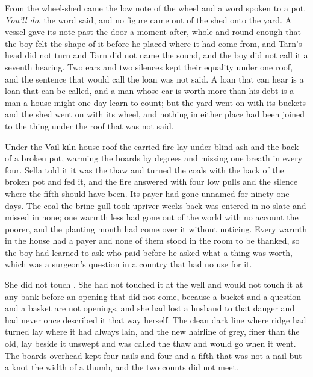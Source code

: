 From the wheel-shed came the low note of the wheel and a word spoken to a pot. \emph{You'll do}, the word said, and no figure came out of the shed onto the yard. A vessel gave its note past the door a moment after, whole and round enough that the boy felt the shape of it before he placed where it had come from, and Tarn's head did not turn and Tarn did not name the sound, and the boy did not call it a seventh hearing. Two ears and two silences kept their equality under one roof, and the sentence that would call the loan was not said. A loan that can hear is a loan that can be called, and a man whose ear is worth more than his debt is a man a house might one day learn to count; but the yard went on with its buckets and the shed went on with its wheel, and nothing in either place had been joined to the thing under the roof that was not said.

Under the Vail kiln-house roof the carried fire lay under blind ash and the back of a broken pot, warming the boards by degrees and missing one breath in every four. Sella told it it was the thaw and turned the coals with the back of the broken pot and fed it, and the fire answered with four low pulls and the silence where the fifth should have been. Its payer had gone unnamed for ninety-one days. The coal the brine-gull took upriver weeks back was entered in no slate and missed in none; one warmth less had gone out of the world with no account the poorer, and the planting month had come over it without noticing. Every warmth in the house had a payer and none of them stood in the room to be thanked, so the boy had learned to ask who paid before he asked what a thing was worth, which was a surgeon's question in a country that had no use for it.

She did not touch . She had not touched it at the well and would not touch it at any bank before an opening that did not come, because a bucket and a question and a basket are not openings, and she had lost a husband to that danger and had never once described it that way herself. The clean dark line where  ridge had turned lay where it had always lain, and the new hairline of grey, finer than the old, lay beside it unswept and was called the thaw and would go when it went. The boards overhead kept four nails and four and a fifth that was not a nail but a knot the width of a thumb, and the two counts did not meet.

